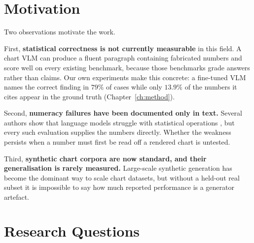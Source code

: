 \section{Motivation}

Two observations motivate the work.

First, \textbf{statistical correctness is not currently measurable} in this
field. A chart VLM can produce a fluent paragraph containing fabricated numbers
and score well on every existing benchmark, because those benchmarks grade
answers rather than claims. Our own experiments make this concrete: a fine-tuned
VLM names the correct finding in $79\%$ of cases while only $13.9\%$ of the
numbers it cites appear in the ground truth (Chapter~\ref{ch:method}).

Second, \textbf{numeracy failures have been documented only in text.}
Several authors show that language models struggle with statistical operations
\citep{stateval,numericbench,numeracynli,bittokens}, but every such evaluation
supplies the numbers directly. Whether the weakness persists when a number must
first be read off a rendered chart is untested.

Third, \textbf{synthetic chart corpora are now standard, and their
generalisation is rarely measured.} Large-scale synthetic generation has become
the dominant way to scale chart datasets, but without a held-out real subset it
is impossible to say how much reported performance is a generator artefact.

\section{Research Questions}
\label{sec:rqs}

